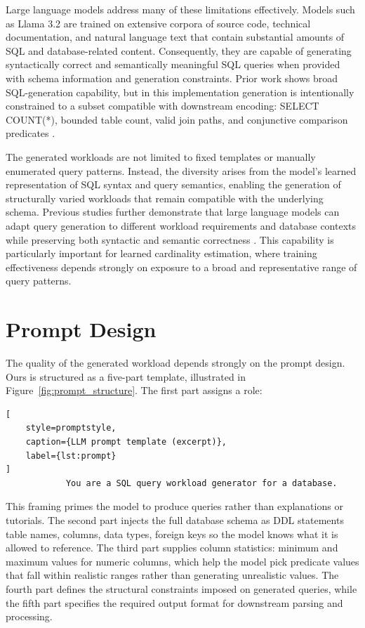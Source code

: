 Large language models address many of these limitations effectively. Models such as Llama 3.2 are trained on extensive corpora of source code, technical documentation, and natural language text that contain substantial amounts of SQL and database-related content. Consequently, they are capable of generating syntactically correct and semantically meaningful SQL queries when provided with schema information and generation constraints. Prior work shows broad SQL-generation capability, but in this implementation generation is intentionally constrained to a subset compatible with downstream encoding: SELECT COUNT(*), bounded table count, valid join paths, and conjunctive comparison predicates \cite{DBLP:journals/corr/abs-2512-20271}.

The generated workloads are not limited to fixed templates or manually enumerated query patterns. Instead, the diversity arises from the model’s learned representation of SQL syntax and query semantics, enabling the generation of structurally varied workloads that remain compatible with the underlying schema. Previous studies further demonstrate that large language models can adapt query generation to different workload requirements and database contexts while preserving both syntactic and semantic correctness \cite{DBLP:journals/corr/abs-2512-20271}. This capability is particularly important for learned cardinality estimation, where training effectiveness depends strongly on exposure to a broad and representative range of query patterns.

\section{Prompt Design}

The quality of the generated workload depends strongly on the prompt design. Ours is structured as a five-part template, illustrated in Figure~\ref{fig:prompt_structure}. The first part assigns a role: \begin{lstlisting}[
    style=promptstyle,
    caption={LLM prompt template (excerpt)},
    label={lst:prompt}
]
            You are a SQL query workload generator for a database.
\end{lstlisting} This framing primes the model to produce queries rather than explanations or tutorials. The second part injects the full database schema as DDL statements table names, columns, data types, foreign keys so the model knows what it is allowed to reference. The third part supplies column statistics: minimum and maximum values for numeric columns, which help the model pick predicate values that fall within realistic ranges rather than generating unrealistic values. The fourth part defines the structural constraints imposed on generated queries, while the fifth part specifies the required output format for downstream parsing and processing.

